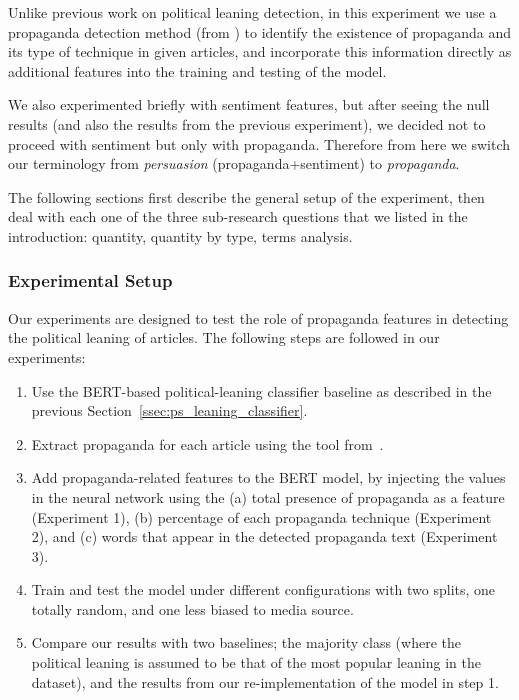 Unlike previous work on political leaning detection, in this experiment we use a propaganda detection method (from \citet{da2019fine}) to identify the existence of propaganda and its type of technique in given articles, and incorporate this information directly as additional features into the training and testing of the model.  

We also experimented briefly with sentiment features, but after seeing the null results (and also the results from the previous experiment), we decided not to proceed with sentiment but only with propaganda. Therefore from here we switch our terminology from \emph{persuasion} (propaganda+sentiment) to \emph{propaganda}.

The following sections first describe the general setup of the experiment, then deal with each one of the three sub-research questions that we listed in the introduction: quantity, quantity by type, terms analysis.%




\subsubsection{Experimental Setup}

Our experiments are designed to test the role of propaganda features in detecting the political leaning of articles. The following steps are followed in our experiments:
\begin{enumerate}
    \item Use the BERT-based political-leaning classifier baseline as described in the previous Section~\ref{ssec:ps_leaning_classifier}. %
    \item Extract propaganda for each article using the tool from~\citet{da2019fine}.
    \item Add propaganda-related features to the BERT model, by injecting the values in the neural network using the (a) total presence of propaganda as a feature (Experiment 1), (b) percentage of each propaganda technique (Experiment 2), and (c) words that appear in the detected propaganda text (Experiment 3).
    \item Train and test the model under different configurations with two splits, one totally random, and one less biased to media source.
    \item Compare our results with two baselines; the majority class (where the political leaning is assumed to be that of the most popular leaning in the dataset), and the results from our re-implementation of the model in step 1. %
\end{enumerate}

